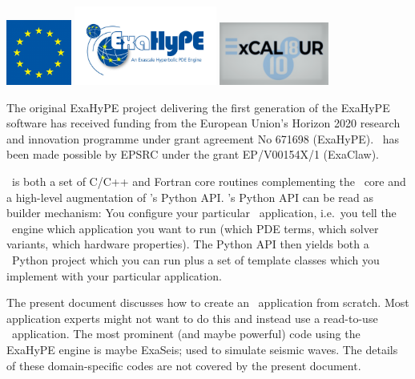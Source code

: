 \chapter{\ExaHyPE}
\label{section:exahype}


 \begin{center}
  \includegraphics[width=0.16\textwidth]{60_exahype/EU.png}
  \includegraphics[width=0.35\textwidth]{60_exahype/ExaHyPE_Logo.jpg}
  \includegraphics[width=0.27\textwidth]{60_exahype/ExCALIBUR.png}
 \end{center}
 { \footnotesize
   The original ExaHyPE project delivering the first generation of the ExaHyPE
   software has received funding from the European Union’s Horizon 2020 research
   and innovation programme under grant agreement No 671698 (ExaHyPE).
   \ExaHyPE\ has been made possible by EPSRC under the grant EP/V00154X/1
   (ExaClaw). 
 }


\ExaHyPE\ is both a set of C/C++ and Fortran core routines complementing the
\Peano\ core and a high-level augmentation of \Peano's Python API.
\ExaHyPE's Python API can be read as builder mechanism:
You configure your particular \ExaHyPE\ application, i.e.~you tell the \ExaHyPE\
engine which application you want to run (which PDE terms, which solver
variants, which hardware properties).
The Python API then yields both a \Peano\ Python project which you can run plus
a set of template classes which you implement with your particular application.


The present document discusses how to create an \ExaHyPE\ application from
scratch.
Most application experts might not want to do this and instead use a read-to-use
\ExaHyPE\ application.
The most prominent (and maybe powerful) code using the ExaHyPE engine is maybe
ExaSeis; used to simulate seismic waves.
The details of these domain-specific codes are not covered by the present
document.


